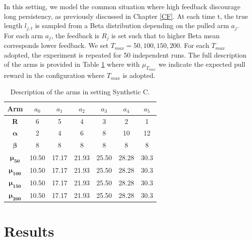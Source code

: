 In this setting, we model the common situation where high feedback discourage long persistency, as previously discussed in Chapter \ref{CF}. At each time t, the true length $l_{j,t}$ is sampled from a Beta distribution depending on the pulled arm $a_j$. For each arm $a_j$, the feedback is $R_j$ is set such that to higher Beta mean corresponds lower feedback. We set $T_{max}=50,100,150,200$. For each $T_{max}$ adopted, the experiment is repeated for 50 independent runs. The full description of the arms is provided in Table \ref{tabSC} where with $\mu_{T_{max}}$ we indicate the expected pull reward in the configuration where $T_{max}$ is adopted.



\begin{table}[H]
	\centering
	\caption{Description of the arms in setting Synthetic C.}
	
	\begin{tabular}{|c|cccccc|}
		\hline
		\textbf{Arm}          & $a_0$ & $a_1$ & $a_2$ & $a_3$ & $a_4$ & $a_5$ \\ \hline
		\textbf{R}            & 6     & 5     & 4     & 3     & 2     & 1     \\
		$\boldsymbol{\alpha}$ & 2     & 4     & 6     & 8     & 10    & 12    \\
		$\boldsymbol{\beta}$  & 8     & 8     & 8     & 8     & 8     & 8     \\
		$\boldsymbol{\mu_{50}}$    & 10.50 & 17.17 & 21.93 & 25.50 & 28.28 & 30.3  \\ 
		$\boldsymbol{\mu_{100}}$    & 10.50 & 17.17 & 21.93 & 25.50 & 28.28 & 30.3  \\ 
		$\boldsymbol{\mu_{150}}$    & 10.50 & 17.17 & 21.93 & 25.50 & 28.28 & 30.3  \\ 
		$\boldsymbol{\mu_{200}}$    & 10.50 & 17.17 & 21.93 & 25.50 & 28.28 & 30.3  \\ \hline
	\end{tabular}
	
	\label{tabSC}
\end{table}

\section{Results}

